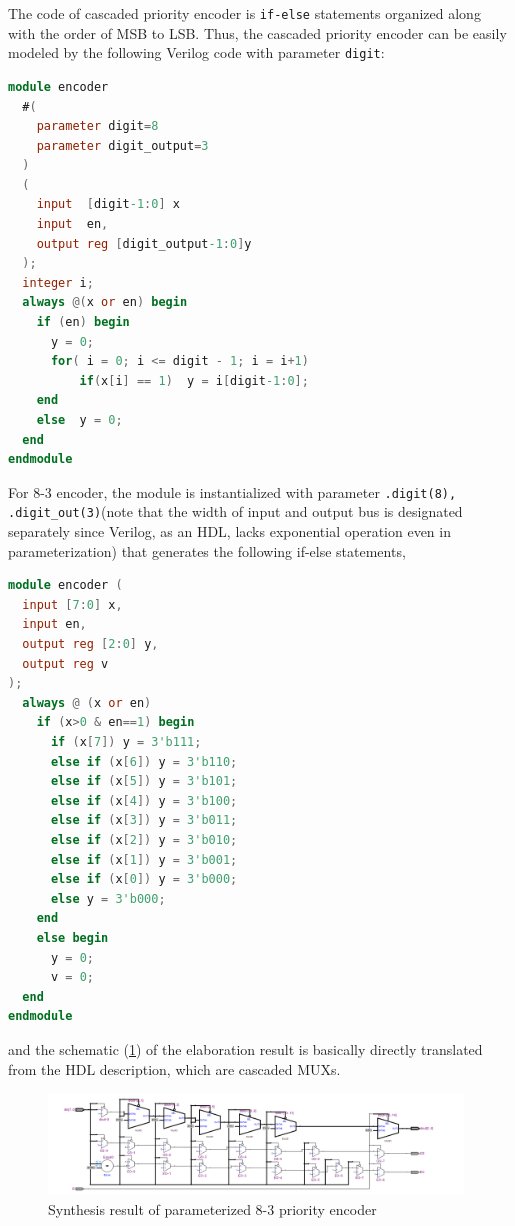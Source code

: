 \documentclass[journal, onecolumn]{IEEEtran}
\begin{document}
The code of cascaded priority encoder is \lstinline{if-else} statements organized along with the order of MSB to LSB. Thus, the cascaded priority encoder can be easily modeled by the following Verilog code with parameter \lstinline{digit}:

\begin{lstlisting}[language=verilog, style=verilog]
module encoder
  #(
    parameter digit=8
    parameter digit_output=3
  )
  (
    input  [digit-1:0] x
    input  en,
    output reg [digit_output-1:0]y
  );
  integer i;
  always @(x or en) begin
    if (en) begin
      y = 0;
      for( i = 0; i <= digit - 1; i = i+1)
          if(x[i] == 1)  y = i[digit-1:0];
    end
    else  y = 0;
  end
endmodule
\end{lstlisting}

For 8-3 encoder, the module is instantialized with parameter \lstinline{.digit(8), .digit_out(3)}(note that the width of input and output bus is designated separately since Verilog, as an HDL, lacks exponential operation even in parameterization) that generates the following if-else statements,

\begin{lstlisting}[language=verilog,style=verilog]
module encoder (
  input [7:0] x,
  input en,
  output reg [2:0] y,
  output reg v
);
  always @ (x or en)
    if (x>0 & en==1) begin
      if (x[7]) y = 3'b111;
      else if (x[6]) y = 3'b110;
      else if (x[5]) y = 3'b101;
      else if (x[4]) y = 3'b100;
      else if (x[3]) y = 3'b011;
      else if (x[2]) y = 3'b010;
      else if (x[1]) y = 3'b001;
      else if (x[0]) y = 3'b000;
      else y = 3'b000;
    end
    else begin
      y = 0;
      v = 0;
  end
endmodule
\end{lstlisting}

and the schematic (\ref{cascaded_83_encoder}) of the elaboration result is basically directly translated from the HDL description, which are cascaded MUXs.

\begin{figure}[htpb]
	\begin{center}
		\includegraphics[width=0.98\textwidth]{report_lab3.assets/20240321191356.png}
		\caption{Synthesis result of parameterized 8-3 priority encoder}
		\label{cascaded_83_encoder}
	\end{center}
\end{figure}
\end{document}
